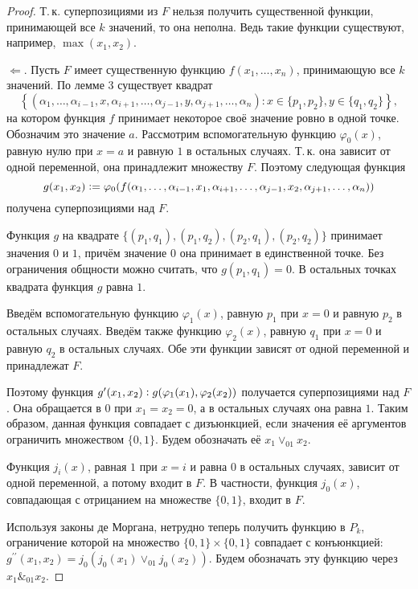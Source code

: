 \begin{proof}
    Т.\,к. суперпозициями из $F$ нельзя получить существенной функции, принимающей все $k$ значений, то она неполна. Ведь такие функции существуют, например, $\max(x_1, x_2)$.

    $\Leftarrow$. Пусть $F$ имеет существенную функцию $f(x_1, \ldots, x_n)$, принимающую все $k$ значений. По лемме 3 существует квадрат
    \[
        \left\{(\alpha_1, \ldots, \alpha_{i - 1}, x, \alpha_{i + 1}, \ldots, \alpha_{j - 1}, y, \alpha_{j + 1}, \ldots, \alpha_n) : x \in \{p_1, p_2\}, y \in \{q_1, q_2\}\right\},
    \]
    на котором функция $f$ принимает некоторое своё значение ровно в одной точке. Обозначим это значение $a$. Рассмотрим вспомогательную функцию $\varphi_0(x)$, равную нулю при $x = a$ и равную $1$ в остальных случаях. Т.\,к. она зависит от одной переменной, она принадлежит множеству $F$. Поэтому следующая функция
    \[
        g(x_1, x_2) \vcentcolon = \varphi_0(f(\alpha_1, \ldots, \alpha_{i - 1}, x_1, \alpha_{i + 1}, \ldots, \alpha_{j - 1}, x_2, \alpha_{j + 1}, \ldots, \alpha_n))
    \]
    получена суперпозициями над $F$.

    Функция $g$ на квадрате $\{(p_1, q_1), (p_1, q_2), (p_2, q_1), (p_2, q_2)\}$ принимает значения $0$ и $1$, причём значение $0$ она принимает в единственной точке. Без ограничения общности можно считать, что $g(p_1, q_1) = 0$. В остальных точках квадрата функция $g$ равна $1$.

    Введём вспомогательную функцию $\varphi_1(x)$, равную $p_1$ при $x = 0$ и равную $p_2$ в остальных случаях. Введём также функцию $\varphi_2(x)$, равную $q_1$ при $x = 0$ и равную $q_2$ в остальных случаях. Обе эти функции зависят от одной переменной и принадлежат $F$.

    Поэтому функция $g^\prime(x_1, x_2) \vcentcolon g(\varphi_1(x_1), \varphi_2(x_2))$ получается суперпозициями над $F$. Она обращается в $0$ при $x_1 = x_2 = 0$, а в остальных случаях она равна $1$. Таким образом, данная функция совпадает с дизъюнкцией, если значения её аргументов ограничить множеством $\{0, 1\}$. Будем обозначать её $x_1 \vee_{01} x_2$.

    Функция $j_i(x)$, равная $1$ при $x = i$ и равна $0$ в остальных случаях, зависит от одной переменной, а потому входит в $F$. В частности, функция $j_0(x)$, совпадающая с отрицанием на множестве $\{0, 1\}$, входит в $F$.

    Используя законы де Моргана, нетрудно теперь получить функцию в $P_k$, ограничение которой на множество $\{0, 1\} \times \{0, 1\}$ совпадает с конъюнкцией: $g^{\prime\prime}(x_1, x_2) = j_0(j_0(x_1) \vee_{01} j_0(x_2))$. Будем обозначать эту функцию через $x_1 \&_{01} x_2$.


\end{proof}
